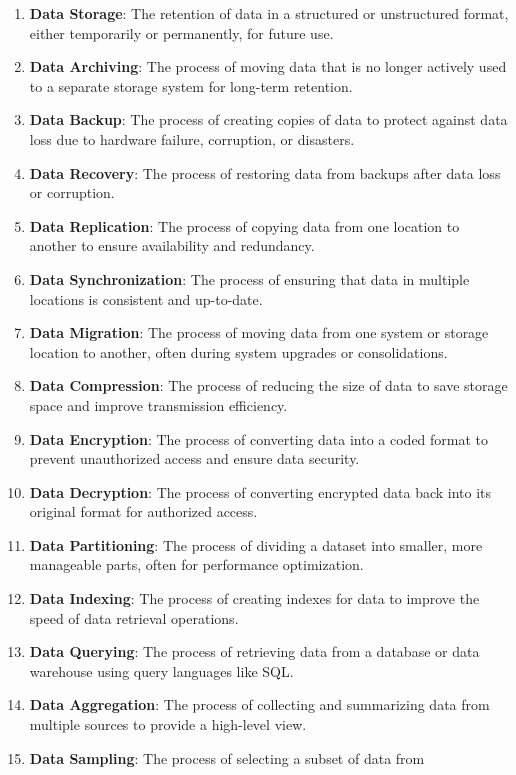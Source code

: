 \documentclass[
  letterpaper,
  DIV=11,
  numbers=noendperiod]{scrartcl}
\begin{document}
\begin{enumerate}
\item
  \textbf{Data Storage}: The retention of data in a structured or
  unstructured format, either temporarily or permanently, for future
  use.
\item
  \textbf{Data Archiving}: The process of moving data that is no longer
  actively used to a separate storage system for long-term retention.
\item
  \textbf{Data Backup}: The process of creating copies of data to
  protect against data loss due to hardware failure, corruption, or
  disasters.
\item
  \textbf{Data Recovery}: The process of restoring data from backups
  after data loss or corruption.
\item
  \textbf{Data Replication}: The process of copying data from one
  location to another to ensure availability and redundancy.
\item
  \textbf{Data Synchronization}: The process of ensuring that data in
  multiple locations is consistent and up-to-date.
\item
  \textbf{Data Migration}: The process of moving data from one system or
  storage location to another, often during system upgrades or
  consolidations.
\item
  \textbf{Data Compression}: The process of reducing the size of data to
  save storage space and improve transmission efficiency.
\item
  \textbf{Data Encryption}: The process of converting data into a coded
  format to prevent unauthorized access and ensure data security.
\item
  \textbf{Data Decryption}: The process of converting encrypted data
  back into its original format for authorized access.
\item
  \textbf{Data Partitioning}: The process of dividing a dataset into
  smaller, more manageable parts, often for performance optimization.
\item
  \textbf{Data Indexing}: The process of creating indexes for data to
  improve the speed of data retrieval operations.
\item
  \textbf{Data Querying}: The process of retrieving data from a database
  or data warehouse using query languages like SQL.
\item
  \textbf{Data Aggregation}: The process of collecting and summarizing
  data from multiple sources to provide a high-level view.
\item
  \textbf{Data Sampling}: The process of selecting a subset of data from

\end{enumerate}
\end{document}
